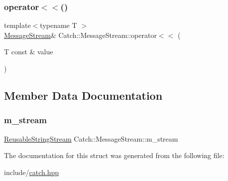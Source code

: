 \subsubsection{\texorpdfstring{operator$<$$<$()}{operator<<()}}
{\footnotesize\ttfamily template$<$typename T $>$ \\
\mbox{\hyperlink{struct_catch_1_1_message_stream}{Message\+Stream}}\& Catch\+::\+Message\+Stream\+::operator$<$$<$ (\begin{DoxyParamCaption}\item[{T const \&}]{value }\end{DoxyParamCaption})\hspace{0.3cm}{\ttfamily [inline]}}



\subsection{Member Data Documentation}
\mbox{\label{struct_catch_1_1_message_stream_a9202520faed8882ef469db9f353ec578}} 
\subsubsection{\texorpdfstring{m\_stream}{m\_stream}}
{\footnotesize\ttfamily \mbox{\hyperlink{class_catch_1_1_reusable_string_stream}{Reusable\+String\+Stream}} Catch\+::\+Message\+Stream\+::m\+\_\+stream}



The documentation for this struct was generated from the following file\+:\begin{DoxyCompactItemize}
\item 
include/\mbox{\hyperlink{catch_8hpp}{catch.\+hpp}}\end{DoxyCompactItemize}
